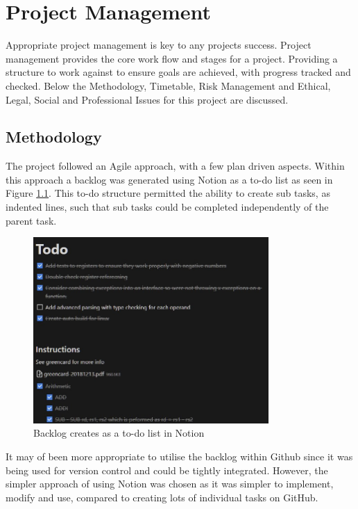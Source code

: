\chapter{Project Management}
\label{ch:project_management}

Appropriate project management is key to any projects success. Project management provides the core work flow and stages for a project. Providing a structure to work against to ensure goals are achieved, with progress tracked and checked. Below the Methodology, Timetable, Risk Management and Ethical, Legal, Social and Professional Issues for this project are discussed.

\section{Methodology}
The project followed an Agile \cite{atlassian_2022_what} approach, with a few plan driven aspects. Within this approach a backlog was generated using Notion \cite{notionlabs_2023_your} as a to-do list as seen in Figure \ref{fig:notion}. This to-do structure permitted the ability to create sub tasks, as indented lines, such that sub tasks could be completed independently of the parent task.

\begin{figure}
    \centering
    \includegraphics[width=0.8\textwidth]{dissertation/DATA/notion-todo.jpg}
    \caption{Backlog creates as a to-do list in Notion}
    \label{fig:notion}
\end{figure}

It may of been more appropriate to utilise the backlog within Github since it was being used for version control and could be tightly integrated. However, the simpler approach of using Notion was chosen as it was simpler to implement, modify and use, compared to creating lots of individual tasks on GitHub.

